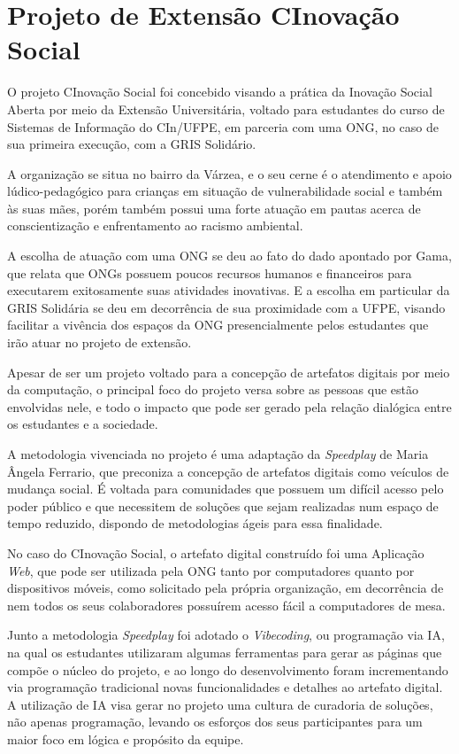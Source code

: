 \section{Projeto de Extensão CInovação Social}
\label{cinovacaosocial}

O projeto CInovação Social foi concebido visando a prática da Inovação Social Aberta por meio da Extensão Universitária, voltado para estudantes do curso de Sistemas de Informação do \gls{CIn}/\gls{UFPE}, em parceria com uma \gls{ONG}, no caso de sua primeira execução, com a GRIS Solidário.

A organização se situa no bairro da Várzea, e o seu cerne é o atendimento e apoio lúdico-pedagógico para crianças em situação de vulnerabilidade social e também às suas mães, porém também possui uma forte atuação em pautas acerca de conscientização e enfrentamento ao racismo ambiental.

A escolha de atuação com uma \gls{ONG} se deu ao fato do dado apontado por Gama, que relata que ONGs possuem poucos recursos humanos e financeiros para executarem exitosamente suas atividades inovativas. E a escolha em particular da GRIS Solidária se deu em decorrência de sua proximidade com a \gls{UFPE}, visando facilitar a vivência dos espaços da ONG presencialmente pelos estudantes que irão atuar no projeto de extensão.

Apesar de ser um projeto voltado para a concepção de artefatos digitais por meio da computação, o principal foco do projeto versa sobre as pessoas que estão envolvidas nele, e todo o impacto que pode ser gerado pela relação dialógica entre os estudantes e a sociedade.

A metodologia vivenciada no projeto é uma adaptação da \textit{Speedplay} de Maria Ângela Ferrario, que preconiza a concepção de artefatos digitais como veículos de mudança social. É voltada para comunidades que possuem um difícil acesso pelo poder público e que necessitem de soluções que sejam realizadas num espaço de tempo reduzido, dispondo de metodologias ágeis para essa finalidade.

No caso do CInovação Social, o artefato digital construído foi uma Aplicação \textit{Web}, que pode ser utilizada pela ONG tanto por computadores quanto por dispositivos móveis, como solicitado pela própria organização, em decorrência de nem todos os seus colaboradores possuírem acesso fácil a computadores de mesa.

Junto a metodologia \textit{Speedplay} foi adotado o \textit{Vibecoding}, ou programação via \gls{IA}, na qual os estudantes utilizaram algumas ferramentas para gerar as páginas que compõe o núcleo do projeto, e ao longo do desenvolvimento foram incrementando via programação tradicional novas funcionalidades e detalhes ao artefato digital. A utilização de \gls{IA} visa gerar no projeto uma cultura de curadoria de soluções, não apenas programação, levando os esforços dos seus participantes para um maior foco em lógica e propósito da equipe.

